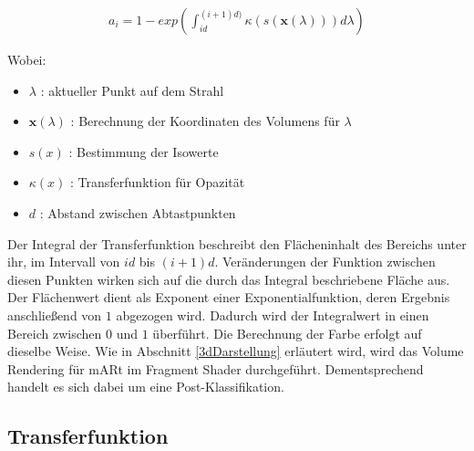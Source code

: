 \begin{align}
   a_i = 1-exp\left ( \int_{id}^{(i+1)d)} \kappa\left ( s(\mathbf{x}(\lambda)) \right ) d\lambda  \right )
\end{align}

Wobei:
\begin{itemize}
\item $\lambda$ 			: aktueller Punkt auf dem Strahl
\item $\mathbf{x}(\lambda)$ : Berechnung der Koordinaten des Volumens für $\lambda$
\item $s(x)$				: Bestimmung der Isowerte
\item $\kappa(x)$			: Transferfunktion für Opazität
\item $d$					: Abstand zwischen Abtastpunkten
\end{itemize}
 

Der Integral der Transferfunktion beschreibt den Flächeninhalt des Bereichs unter ihr, im Intervall von $id$ bis $(i+1)d$. Veränderungen der Funktion zwischen diesen Punkten wirken sich auf die durch das Integral beschriebene Fläche aus. 
Der Flächenwert dient als Exponent einer Exponentialfunktion, deren Ergebnis anschließend von $1$ abgezogen wird. Dadurch wird der Integralwert in einen Bereich zwischen $0$ und $1$ überführt. 
Die Berechnung der Farbe erfolgt auf dieselbe Weise.
Wie in Abschnitt \ref{3dDarstellung} erläutert wird, wird das Volume Rendering für mARt im Fragment Shader durchgeführt. Dementsprechend handelt es sich dabei um eine Post-Klassifikation.

\subsection{Transferfunktion}

